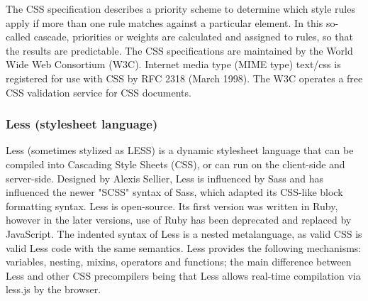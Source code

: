 The CSS specification describes a priority scheme to determine which style rules apply if more than one rule matches against a particular element. In this so-called cascade, priorities or weights are calculated and assigned to rules, so that the results are predictable.
The CSS specifications are maintained by the World Wide Web Consortium (W3C). Internet media type (MIME type) text/css is registered for use with CSS by RFC 2318 (March 1998). The W3C operates a free CSS validation service for CSS documents.\cite{22}

\subsubsection{Less (stylesheet language)}
Less (sometimes stylized as LESS) is a dynamic stylesheet language that can be compiled into Cascading Style Sheets (CSS), or can run on the client-side and server-side. Designed by Alexis Sellier, Less is influenced by Sass and has influenced the newer "SCSS" syntax of Sass, which adapted its CSS-like block formatting syntax. Less is open-source. Its first version was written in Ruby, however in the later versions, use of Ruby has been deprecated and replaced by JavaScript. The indented syntax of Less is a nested metalanguage, as valid CSS is valid Less code with the same semantics. Less provides the following mechanisms: variables, nesting, mixins, operators and functions; the main difference between Less and other CSS precompilers being that Less allows real-time compilation via less.js by the browser.\cite{23}
